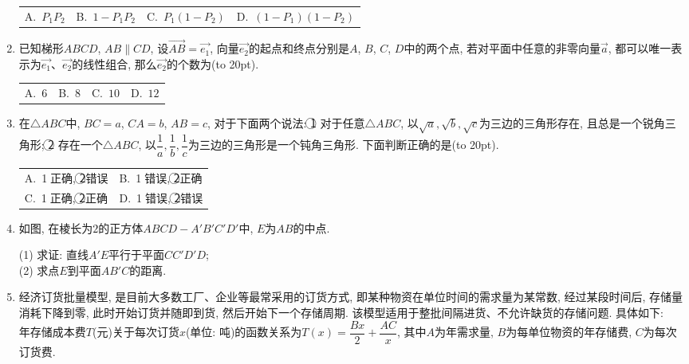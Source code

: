\documentclass[10pt,a4paper]{article}
\newcommand{\bracket}[1]{(\hbox to #1pt{})}
\newcommand{\twoch}[4]{\par\begin{tabular}{p{.46\textwidth}p{.46\textwidth}}
A.~#1& B.~#2\\
C.~#3& D.~#4
\end{tabular}}
\newcommand{\fourch}[4]{\par\begin{tabular}{p{.23\textwidth}p{.23\textwidth}p{.23\textwidth}p{.23\textwidth}}
A.~#1 &B.~#2& C.~#3& D.~#4
\end{tabular}}
\begin{document}
\begin{enumerate}[1.]
\fourch{$P_1P_2$}{$1-P_1P_2$}{$P_1(1-P_2)$}{$(1-P_1)(1-P_2)$}
\item 已知梯形$ABCD$, $AB\parallel CD$, 设$\overrightarrow{AB}=\overrightarrow{e_1}$, 向量$\overrightarrow{e_2}$的起点和终点分别是$A$, $B$, $C$, $D$中的两个点, 若对平面中任意的非零向量$\overrightarrow a$, 都可以唯一表示为$\overrightarrow{e_1}$、$\overrightarrow{e_2}$的线性组合, 那么$\overrightarrow{e_2}$的个数为\bracket{20}.
\fourch{$6$}{$8$}{$10$}{$12$}
\item 在$\triangle ABC$中, $BC=a$, $CA=b$, $AB=c$, 对于下面两个说法:
\textcircled{1} 对于任意$\triangle ABC$, 以$\sqrt a,\sqrt b,\sqrt c$为三边的三角形存在, 且总是一个锐角三角形;
\textcircled{2} 存在一个$\triangle ABC$, 以$\dfrac 1a,\dfrac 1b,\dfrac 1c$为三边的三角形是一个钝角三角形.
下面判断正确的是\bracket{20}.
\twoch{\textcircled{1}正确, \textcircled{2}错误}{\textcircled{1}错误, \textcircled{2}正确}{\textcircled{1}正确, \textcircled{2}正确}{\textcircled{1}错误, \textcircled{2}错误}
\item  如图, 在棱长为$2$的正方体$ABCD-A'B'C'D'$中, $E$为$AB$的中点.
\begin{center}
\end{center}
(1) 求证: 直线$A'E$平行于平面$CC'D'D$;\\
(2) 求点$E$到平面$AB'C$的距离.
\item 经济订货批量模型, 是目前大多数工厂、企业等最常采用的订货方式, 即某种物资在单位时间的需求量为某常数, 经过某段时间后, 存储量消耗下降到零, 此时开始订货并随即到货, 然后开始下一个存储周期. 该模型适用于整批间隔进货、不允许缺货的存储问题. 具体如下:\\
年存储成本费$T$(元)关于每次订货$x$(单位: 吨)的函数关系为$T(x)=\dfrac{Bx}2+\dfrac{AC}x$, 其中$A$为年需求量, $B$为每单位物资的年存储费, $C$为每次订货费.\\

\end{enumerate}
\end{document}
